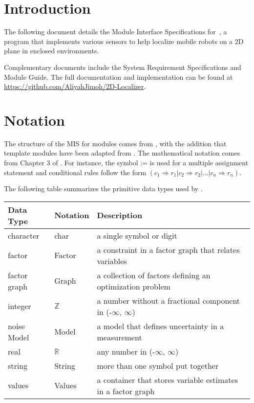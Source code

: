 \documentclass[12pt, titlepage]{article}
\begin{document}
\section{Introduction}

The following document details the Module Interface Specifications for~\progname, a program that implements various sensors to help localize mobile robots on a 2D plane in enclosed environments.

Complementary documents include the System Requirement Specifications
and Module Guide.  The full documentation and implementation can be
found at \url{https://github.com/AliyahJimoh/2D-Localizer}.

\section{Notation}

The structure of the MIS for modules comes from \citet{HoffmanAndStrooper1995},
with the addition that template modules have been adapted from
\cite{GhezziEtAl2003}.  The mathematical notation comes from Chapter 3 of
\citet{HoffmanAndStrooper1995}.  For instance, the symbol := is used for a
multiple assignment statement and conditional rules follow the form $(c_1
\Rightarrow r_1 | c_2 \Rightarrow r_2 | ... | c_n \Rightarrow r_n )$.

The following table summarizes the primitive data types used by \progname. 

\begin{center}
\renewcommand{\arraystretch}{1.2}
\noindent 
\begin{tabular}{l l p{7.5cm}} 
\toprule 
\textbf{Data Type} & \textbf{Notation} & \textbf{Description}\\ 
\midrule
character & char & a single symbol or digit\\
factor & Factor & a constraint in a factor graph that relates variables\\
factor graph & Graph & a collection of factors defining an optimization problem\\
integer & $\mathbb{Z}$ & a number without a fractional component in (-$\infty$, $\infty$) \\
noise Model & Model & a model that defines uncertainty in a measurement \\
real & $\mathbb{R}$ & any number in (-$\infty$, $\infty$)\\
string & String & more than one symbol put together\\
values & Values & a container that stores variable estimates in a factor graph\\
\bottomrule
\end{tabular} 
\end{center}
\end{document}

